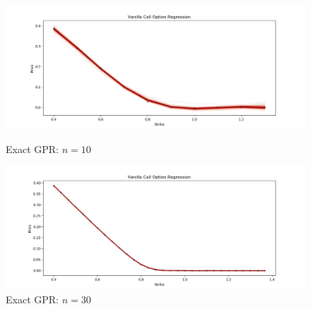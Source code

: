 \documentclass[12pt,a4paper,oneside]{book}
\begin{document}
\begin{figure}[!htb]
   \begin{minipage}{0.47\textwidth}
     \centering
     \includegraphics[width=1.1\linewidth]{full_bayesian_1}
     \caption*{Exact GPR: $n= 10$}\label{fig:bayesian_1}
   \end{minipage}\hfill
   \begin{minipage}{0.47\textwidth}
     \centering
     \includegraphics[width=1.1\linewidth]{full_bayesian_2}
     \caption*{Exact GPR: $n=30$}\label{fig:bayesian_2}
   \end{minipage}\hfill
\end{figure}
\end{document}
